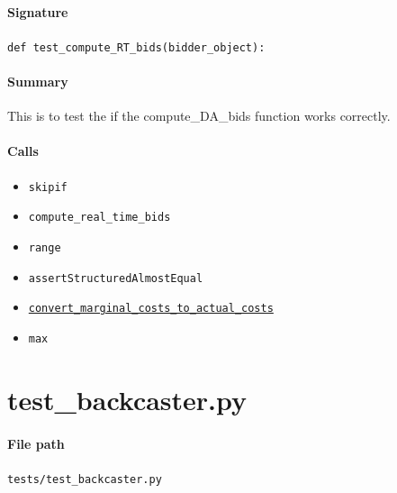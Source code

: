\documentclass[11pt]{report}
\begin{document}
\paragraph{Signature} \texttt{def test\_compute\_RT\_bids(bidder\_object):}
\paragraph{Summary} This is to test the if the compute\_DA\_bids function works correctly.
\paragraph{Calls}
\begin{itemize}[leftmargin=*]
  \item \texttt{skipif}
  \item \texttt{compute\_real\_time\_bids}
  \item \texttt{range}
  \item \texttt{assertStructuredAlmostEqual}
  \item \hyperref[def:utils.py:convert_marginal_costs_to_actual_costs:L15]{\texttt{convert\_marginal\_costs\_to\_actual\_costs}}
  \item \texttt{max}
\end{itemize}

\section{test\_backcaster.py}
\label{file:tests-test_backcaster.py}
\paragraph{File path} \texttt{tests/test\_backcaster.py}
\end{document}

